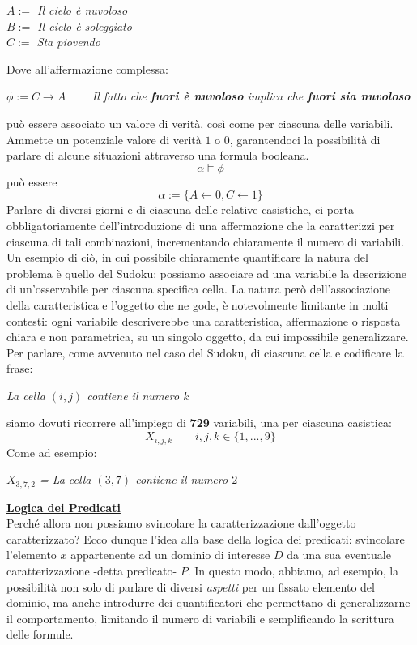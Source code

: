 \documentclass[a4paper,10pt]{article}
\begin{document}
\begin{center}
    \textit{$A:=$ Il cielo è nuvoloso}\\
    \textit{$B:=$ Il cielo è soleggiato}\\
    \textit{$C:=$ Sta piovendo}
\end{center}
Dove all'affermazione complessa: 
\begin{center}
    $\phi := C \rightarrow A\quad\quad$
    \textit{Il fatto che \textbf{fuori è nuvoloso} implica che \textbf{fuori sia nuvoloso}}
\end{center}
può essere associato un valore di verità, così come per ciascuna delle variabili. Ammette un potenziale valore di verità $1$ o $0$, garantendoci la possibilità di parlare di alcune situazioni attraverso una formula booleana.
$$\alpha\models \phi$$ può essere $$\alpha :=\{A\leftarrow 0, C\leftarrow1\}$$
Parlare di diversi giorni e di ciascuna delle relative casistiche, ci porta obbligatoriamente dell'introduzione di una affermazione che la caratterizzi per ciascuna di tali combinazioni, incrementando chiaramente il numero di variabili.\\
Un esempio di ciò, in cui possibile chiaramente quantificare la natura del problema è quello del Sudoku: possiamo associare ad una variabile la descrizione di un'osservabile per ciascuna specifica cella. La natura però dell'associazione della caratteristica e l'oggetto che ne gode, è notevolmente limitante in molti contesti: ogni variabile descriverebbe una caratteristica, affermazione o risposta chiara e non parametrica, su un singolo oggetto, da cui impossibile generalizzare. Per parlare, come avvenuto nel caso del Sudoku, di ciascuna cella e codificare la frase: 
\begin{center}
    \textit{La cella $(i,j)$ contiene il numero $k$}
\end{center}
siamo dovuti ricorrere all'impiego di \textbf{729} variabili, una per ciascuna casistica:
$$X_{i,j,k}\quad \quad i,j,k\in\{1,...,9\}$$
Come ad esempio:
\begin{center}
    \textit{$X_{3,7,2}$ = La cella $(3,7)$ contiene il numero $2$}\\[1cm]
\end{center}

\underline{\textbf{Logica dei Predicati}}\\

Perché allora non possiamo svincolare la caratterizzazione dall'oggetto caratterizzato? Ecco dunque l'idea alla base della logica dei predicati: svincolare l'elemento $x$ appartenente ad un dominio di interesse $D$ da una sua eventuale caratterizzazione -detta predicato- $P$. In questo modo, abbiamo, ad esempio, la possibilità non solo di parlare di diversi \textit{aspetti}  per un fissato elemento del dominio, ma anche introdurre dei quantificatori che permettano di generalizzarne il comportamento, limitando il numero di variabili e semplificando la scrittura delle formule.
\end{document}
